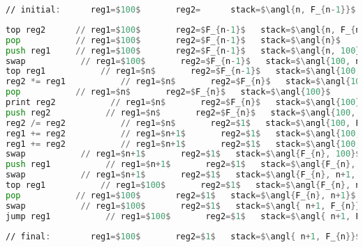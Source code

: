 \documentclass[11pt]{article}
\DeclarePairedDelimiter\angl{\langle}{\rangle}
\begin{document}
\begin{enumerate}
\begin{lstlisting}[language=asm, mathescape, numbers=none]
// initial:      reg1=$100$       reg2=      stack=$\angl{n, F_{n-1}}$
\end{lstlisting}
\begin{lstlisting}[language=asm, mathescape, firstnumber=100]
top reg2      // reg1=$100$       reg2=$F_{n-1}$   stack=$\angl{n, F_{n-1}}$
pop           // reg1=$100$       reg2=$F_{n-1}$   stack=$\angl{n}$
push reg1     // reg1=$100$       reg2=$F_{n-1}$   stack=$\angl{n, 100}$
swap           // reg1=$100$       reg2=$F_{n-1}$   stack=$\angl{100, n}$
top reg1           // reg1=$n$       reg2=$F_{n-1}$   stack=$\angl{100, n}$
reg2 *= reg1           // reg1=$n$       reg2=$F_{n}$   stack=$\angl{100, n}$
pop           // reg1=$n$       reg2=$F_{n}$   stack=$\angl{100}$
print reg2           // reg1=$n$       reg2=$F_{n}$   stack=$\angl{100}$
push reg2           // reg1=$n$       reg2=$F_{n}$   stack=$\angl{100, F_{n}}$
reg2 /= reg2           // reg1=$n$       reg2=$1$   stack=$\angl{100, F_{n}}$
reg1 += reg2           // reg1=$n+1$       reg2=$1$   stack=$\angl{100, F_{n}}$
reg1 += reg2           // reg1=$n+1$       reg2=$1$   stack=$\angl{100, F_{n}}$
swap           // reg1=$n+1$       reg2=$1$   stack=$\angl{F_{n}, 100}$
push reg1           // reg1=$n+1$       reg2=$1$   stack=$\angl{F_{n}, 100, n+1}$
swap           // reg1=$n+1$       reg2=$1$   stack=$\angl{F_{n}, n+1, 100}$
top reg1           // reg1=$100$       reg2=$1$   stack=$\angl{F_{n}, n+1, 100}$
pop           // reg1=$100$       reg2=$1$   stack=$\angl{F_{n}, n+1}$
swap           // reg1=$100$       reg2=$1$   stack=$\angl{ n+1, F_{n}}$
jump reg1           // reg1=$100$       reg2=$1$   stack=$\angl{ n+1, F_{n}}$
\end{lstlisting}
\begin{lstlisting}[language=asm, mathescape,numbers=none]
// final:        reg1=$100$       reg2=$1$   stack=$\angl{ n+1, F_{n}}$
\end{lstlisting}
\end{enumerate}
\end{document}
